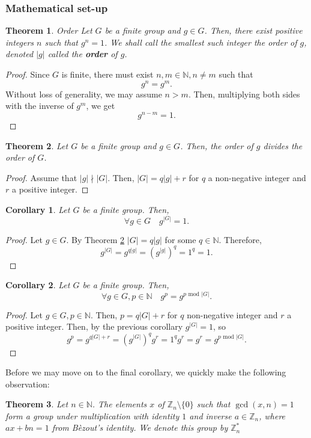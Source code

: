 \documentclass{article}
\newtheorem{theorem}{Theorem}[section]
\newtheorem{corollary}{Corollary}[theorem]
\theoremstyle{definition}
\newcommand{\Int}{\mathbb{Z}}
\newcommand{\Nat}{\mathbb{N}}
\renewcommand{\mod}{\,\,\text{mod}\,\,}
\begin{document}
\subsubsection{Mathematical set-up}
\begin{theorem}{Order}
  Let $G$ be a finite group and $g \in G$. Then, there exist positive integers
  $n$ such that $g^n = 1$. We shall call the smallest such integer the order of
  $g$, denoted $|g|$ called the \textbf{order} of $g$.
\end{theorem}
\begin{proof}
  Since $G$ is finite, there must exist $n, m \in \Nat, n \neq m$ such that
  \[
    g^n = g^m.
  \]
  Without loss of generality, we may assume $n > m$. Then, multiplying both
  sides with the inverse of $g^m$, we get
  \[
    g^{n - m } = 1.
  \]
\end{proof}
\begin{theorem}
  \label{thm:elemorderdiv}
  Let $G$ be a finite group and $g \in G$. Then, the order of $g$ divides the
  order of $G$.
\end{theorem}
\begin{proof}
  Assume that $|g| \nmid |G|$. Then, $|G| = q|g| + r$ for $q$ a non-negative
  integer and $r$ a positive integer.
\end{proof}
\begin{corollary}
  \label{cor:elemgroupordpow}
  Let $G$ be a finite group. Then,
  \[
    \forall g \in G\quad g^{|G|} = 1.
  \]
\end{corollary}
\begin{proof}
  Let $g \in G$. By Theorem \ref{thm:elemorderdiv} $|G| = q|g|$ for some $q \in
  \Nat$. Therefore,
  \[
    g^{|G|} = g^{q|g|} = (g^{|g|})^q = 1^q = 1.
  \]
\end{proof}
\begin{corollary}
  \label{thm:groupordpow}
  Let $G$ be a finite group. Then,
  \[
    \forall g \in G, p \in \Nat\quad g^p = g^{p \mod |G|}.
  \]
\end{corollary}
\begin{proof}
  \label{thm:grouppowmod}
  Let $g \in G, p \in \Nat$. Then, $p = q|G| + r$ for $q$ non-negative integer
  and $r$ a positive integer. Then, by the previous corollary $g^{|G|} = 1$, so
  \[
    g^p = g^{q|G| + r} = (g^{|G|})^qg^r = 1^qg^r= g^r = g^{p \mod |G|}.
  \]
\end{proof}
Before we may move on to the final corollary, we quickly make the following
observation:
\begin{theorem}
  Let $n \in \Nat$. The elements $x$ of $\Int_n \setminus \{0\}$ such that $\gcd(x, n) = 1$ form
  a group under multiplication with identity $1$ and inverse $a \in \Int_n$,
  where $ax + bn = 1$ from B\`ezout's identity. We denote this group by $\Int^*_n$
\end{theorem}
\end{document}
